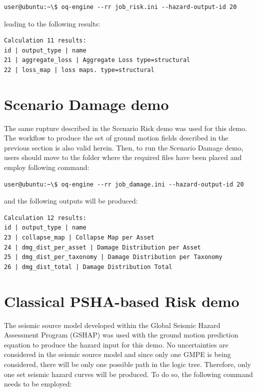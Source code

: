 \begin{Verbatim}[frame=single, commandchars=\\\{\}, samepage=true]
user@ubuntu:~\$ oq-engine --rr job_risk.ini --hazard-output-id 20
\end{Verbatim}

leading to the following results:

\begin{Verbatim}[frame=single, commandchars=\\\{\}, samepage=true]
Calculation 11 results:
id | output_type | name
21 | aggregate_loss | Aggregate Loss type=structural
22 | loss_map | loss maps. type=structural
\end{Verbatim}

\section{Scenario Damage demo}
The same rupture described in the Scenario Risk demo was used for this demo. The workflow to produce the set of ground motion fields described in the previous section is also valid herein. Then, to run the Scenario Damage demo, users should move to the folder where the required files have been placed and employ following command:

\begin{Verbatim}[frame=single, commandchars=\\\{\}, samepage=true]
user@ubuntu:~\$ oq-engine --rr job_damage.ini --hazard-output-id 20
\end{Verbatim}

and the following outputs will be produced:

\begin{Verbatim}[frame=single, commandchars=\\\{\}, samepage=true]
Calculation 12 results:
id | output_type | name
23 | collapse_map | Collapse Map per Asset
24 | dmg_dist_per_asset | Damage Distribution per Asset
25 | dmg_dist_per_taxonomy | Damage Distribution per Taxonomy
26 | dmg_dist_total | Damage Distribution Total
\end{Verbatim}

\section{Classical PSHA-based Risk demo}
\label{sec:classical_risk_demo}
The seismic source model developed within the Global Seismic Hazard Assessment Program (GSHAP) was used with the \cite{chiou2008} ground motion prediction equation to produce the hazard input for this demo. No uncertainties are considered in the seismic source model and since only one GMPE is being considered, there will be only one possible path in the logic tree. Therefore, only one set seismic hazard curves will be produced. To do so, the following command needs to be employed:

